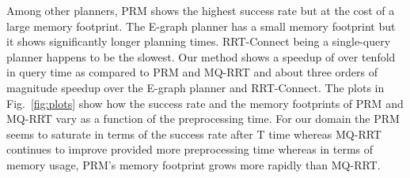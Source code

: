 \documentclass[letterpaper]{article} %
\begin{document}
Among other planners, \textsf{PRM} shows the highest success rate but at the cost of a large memory footprint. The E-graph planner has a small memory footprint but it shows significantly longer planning times. \textsf{RRT}-Connect being a single-query planner happens to be the slowest. Our method shows a speedup of over tenfold in query time as compared to \textsf{PRM} and MQ-RRT and about three orders of magnitude speedup over the E-graph planner and \textsf{RRT}-Connect. The plots in Fig.~\ref{fig:plots} show how the success rate and the memory footprints of \textsf{PRM} and \textsf{MQ-RRT} vary as a function of the preprocessing time. For our domain the \textsf{PRM} seems to saturate in terms of the success rate after T time whereas \textsf{MQ-RRT} continues to improve provided more preprocessing time whereas in terms of memory usage, \textsf{PRM}'s memory footprint grows more rapidly than \textsf{MQ-RRT}.
\end{document}
